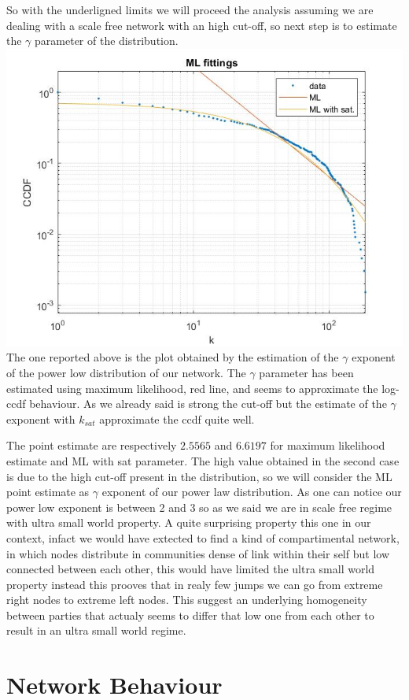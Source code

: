 \documentclass{article}%
\begin{document}
So with the underligned limits we will proceed the analysis assuming we are dealing with a scale free network with an high cut-off, so next step is to estimate the $\gamma$ parameter of the distribution.\\


\includegraphics[scale=0.5]{ML_fit}
\\

The one reported above is the plot obtained by the estimation of the $\gamma$ exponent of the power low distribution of our network. The $\gamma$ parameter has been estimated using maximum likelihood, red line, and seems to approximate the log-ccdf behaviour. As we already said is strong the cut-off but the estimate of the $\gamma$ exponent with $k_{sat}$ approximate the ccdf quite well. 

The point estimate are respectively $2.5565$ and $6.6197$ for maximum likelihood estimate and ML with sat parameter. The high value obtained in the second case is due to the high cut-off present in the distribution, so we will consider the ML point estimate as $\gamma$ exponent of our power law distribution. 
As one can notice our power low exponent is between 2 and 3 so as we said we are in scale free regime with ultra small world property. A quite surprising property this one in our context, infact we would have extected to find a kind of compartimental network, in which nodes distribute in communities dense of link within their self but low connected between each other, this would have limited the ultra small world property instead this prooves that in realy few jumps we can go from extreme right nodes to extreme left nodes. This suggest an underlying homogeneity between parties that actualy seems to differ that low one from each other to result in an ultra small world regime.

\section*{Network Behaviour}
\end{document}
